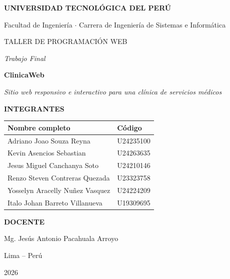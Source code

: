 \documentclass[11pt,a4paper]{article}
\begin{document}
\begin{titlepage}
\thispagestyle{empty}
\centering
\vspace*{1.5cm}
{\large\bfseries\color{navy} UNIVERSIDAD TECNOLÓGICA DEL PERÚ\par}
\vspace{0.3cm}
{\color{inkgray} Facultad de Ingeniería $\cdot$ Carrera de Ingeniería de Sistemas e Informática\par}
\vspace{1.8cm}
{\large\color{inkgray} TALLER DE PROGRAMACIÓN WEB\par}
{\itshape\color{inkgray} Trabajo Final\par}
\vspace{1.0cm}
{\Huge\bfseries\color{navy} ClinicaWeb\par}
\vspace{0.4cm}
{\large\itshape Sitio web responsivo e interactivo para una clínica de servicios médicos\par}
\vspace{1.6cm}

{\bfseries\color{clinicgreen} INTEGRANTES\par}
\vspace{0.4cm}
\begin{tabular}{>{\raggedright}p{9cm} l}
\toprule
\textbf{Nombre completo} & \textbf{Código} \\
\midrule
Adriano Joao Souza Reyna & U24235100 \\
Kevin Asencios Sebastian & U24263635 \\
Jesus Miguel Canchanya Soto & U24210146 \\
Renzo Steven Contreras Quezada & U23323758 \\
Yosselyn Aracelly Nuñez Vasquez & U24224209 \\
Italo Johan Barreto Villanueva & U19309695 \\
\bottomrule
\end{tabular}

\vspace{1.4cm}
{\bfseries\color{clinicgreen} DOCENTE\par}
\vspace{0.2cm}
{Mg. Jesús Antonio Pacahuala Arroyo\par}
\vspace{1.6cm}
{Lima -- Perú\par}
{2026\par}
\end{titlepage}
\end{document}
